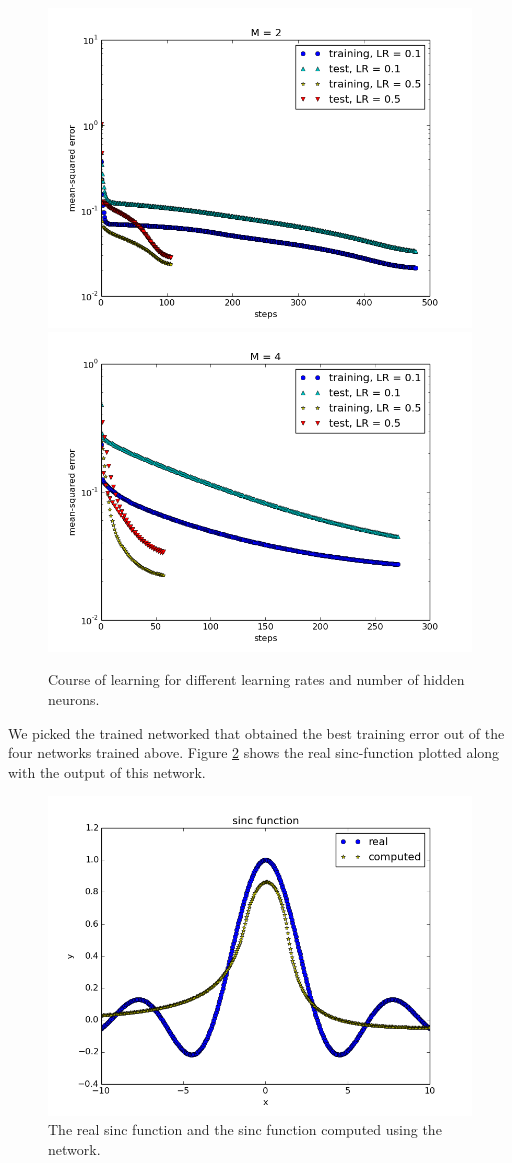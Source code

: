 \documentclass[a4paper]{article}
\begin{document}
\begin{figure}[H]
  \begin{adjustwidth}{-7em}{-7em}
    \centering
    \includegraphics[width=.47\linewidth]{figures/course_of_learning1.png}
    \includegraphics[width=.47\linewidth]{figures/course_of_learning2.png}
  \end{adjustwidth}
  \caption{Course of learning for different learning rates and number of hidden neurons.}
  \label{fig:course_of_learning}
\end{figure}

We picked the trained networked that obtained the best training error out of the four networks trained above. Figure \ref{fig:sinc} shows the real sinc-function plotted along with the output of this network.

\begin{figure}[H]
    \centering
    \includegraphics[width=.7\linewidth]{figures/sinc.png}
  \caption{The real sinc function and the sinc function computed using the network.}
  \label{fig:sinc}
\end{figure}
\end{document}
